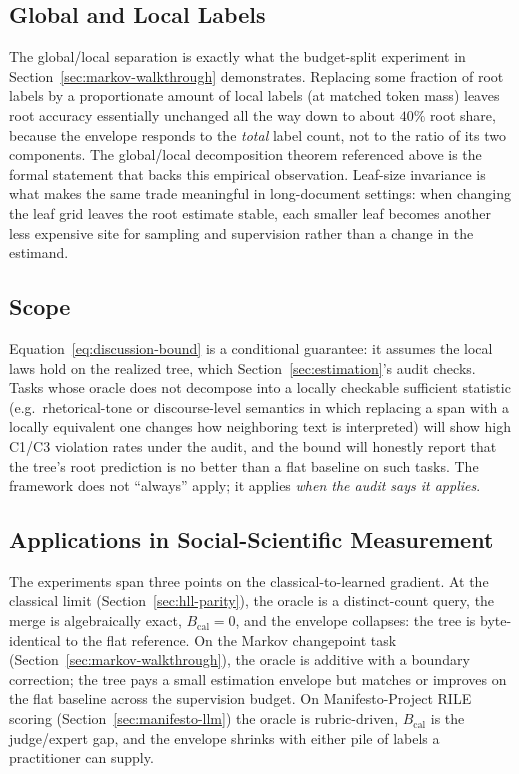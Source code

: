 \subsection{Global and Local Labels}

The global/local separation is exactly what the budget-split
experiment in Section~\ref{sec:markov-walkthrough} demonstrates.
Replacing some fraction of root labels by a proportionate amount of
local labels (at matched token mass) leaves root accuracy essentially
unchanged all the way down to about $40\%$ root share, because the
envelope responds to the \emph{total} label count, not to the ratio
of its two components. The global/local decomposition theorem referenced
above is the formal statement that backs this empirical observation.
Leaf-size invariance is what makes the same trade meaningful in
long-document settings: when changing the leaf grid leaves the root
estimate stable, each smaller leaf becomes another less expensive site
for sampling and supervision rather than a change in the estimand.

\subsection{Scope}

Equation~\eqref{eq:discussion-bound} is a conditional guarantee: it
assumes the local laws hold on the realized tree, which
Section~\ref{sec:estimation}'s audit checks. Tasks whose oracle does
not decompose into a locally checkable sufficient statistic (e.g.\
rhetorical-tone or discourse-level semantics in which replacing a
span with a locally equivalent one changes how neighboring text is
interpreted) will show high C1/C3 violation rates under the audit,
and the bound will honestly report that the tree's root prediction is
no better than a flat baseline on such tasks. The framework does not
``always'' apply; it applies \emph{when the audit says it applies}.

\subsection{Applications in Social-Scientific Measurement}

The experiments span three points on the classical-to-learned
gradient. At the classical limit (Section~\ref{sec:hll-parity}), the
oracle is a distinct-count query, the merge is algebraically exact,
$B_{\mathrm{cal}} = 0$, and the envelope collapses: the tree is
byte-identical to the flat reference. On the Markov changepoint task
(Section~\ref{sec:markov-walkthrough}), the oracle is additive with a
boundary correction; the tree pays a small estimation envelope but
matches or improves on the flat baseline across the supervision
budget. On Manifesto-Project RILE scoring (Section~\ref{sec:manifesto-llm})
the oracle is rubric-driven, $B_{\mathrm{cal}}$ is the judge/expert
gap, and the envelope shrinks with either pile of labels a
practitioner can supply.

